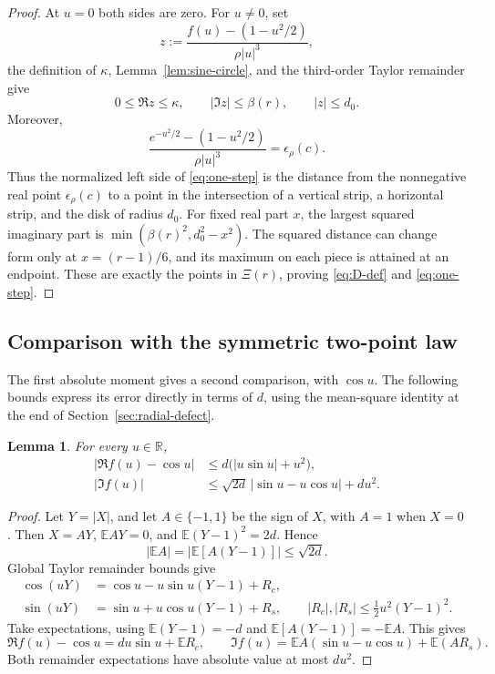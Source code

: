 \documentclass[11pt]{article}
\newtheorem{lemma}[theorem]{Lemma}
\newcommand{\E}{\mathbb E}
\newcommand{\R}{\mathbb R}
\newcommand{\abs}[1]{\lvert#1\rvert}
\begin{document}
\begin{proof}
At \(u=0\) both sides are zero. For \(u\ne0\), set
\[
 z:=\frac{f(u)-(1-u^2/2)}{\rho\abs u^3},
\]
the definition of \(\kappa\), Lemma~\ref{lem:sine-circle}, and the
third-order Taylor remainder give
\[
 0\le\Re z\le\kappa,\qquad
 \abs{\Im z}\le\beta(r),\qquad \abs z\le d_0.
\]
Moreover,
\[
 \frac{e^{-u^2/2}-(1-u^2/2)}{\rho\abs u^3}
 =\epsilon_\rho(c).
\]
Thus the normalized left side of \eqref{eq:one-step} is the distance
from the nonnegative real point \(\epsilon_\rho(c)\) to a point in the
intersection of a vertical strip, a horizontal strip, and the disk
of radius \(d_0\).
For fixed real part \(x\), the largest squared imaginary part is
\(\min(\beta(r)^2,d_0^2-x^2)\).  The squared distance can change form
only at \(x=(r-1)/6\), and its maximum on each piece is attained at an
endpoint.  These are exactly the points in \(\Xi(r)\), proving
\eqref{eq:D-def} and \eqref{eq:one-step}.
\end{proof}

\subsection{Comparison with the symmetric two-point law}\label{sec:radial-cf}

The first absolute moment gives a second comparison, with \(\cos u\).
The following bounds express its error directly in terms of \(d\),
using the mean-square identity at the end of Section~\ref{sec:radial-defect}.

\begin{lemma}\label{lem:radial}
For every \(u\in\R\),
\[
\begin{aligned}
 |\Re f(u)-\cos u|&\le d\bigl(|u\sin u|+u^2\bigr),\\
 |\Im f(u)|&\le\sqrt{2d}\,|\sin u-u\cos u|+du^2.
\end{aligned}
\label{eq:radial-cf}\tag{3.5}
\]
\end{lemma}

\begin{proof}
Let \(Y=|X|\), and let \(A\in\{-1,1\}\) be the sign of \(X\), with \(A=1\)
when \(X=0\). Then \(X=AY\), \(\E AY=0\), and
\(\E(Y-1)^2=2d\). Hence
\[
 |\E A|=|\E[A(Y-1)]|\le\sqrt{2d}.
\]
Global Taylor remainder bounds give
\[
\begin{aligned}
 \cos(uY)&=\cos u-u\sin u(Y-1)+R_c,\\
 \sin(uY)&=\sin u+u\cos u(Y-1)+R_s,
 \qquad |R_c|,|R_s|\le\tfrac12u^2(Y-1)^2.
\end{aligned}
\]
Take expectations, using \(\E(Y-1)=-d\) and
\(\E[A(Y-1)]=-\E A\). This gives
\[
 \Re f(u)-\cos u=du\sin u+\E R_c,\qquad
 \Im f(u)=\E A(\sin u-u\cos u)+\E(AR_s).
\]
Both remainder expectations have absolute value at most \(du^2\).
\end{proof}
\end{document}
